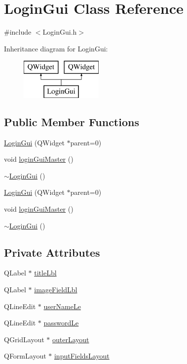 \hypertarget{class_login_gui}{\section{Login\-Gui Class Reference}
\label{class_login_gui}
}


{\ttfamily \#include $<$Login\-Gui.\-h$>$}

Inheritance diagram for Login\-Gui\-:\begin{figure}[H]
\begin{center}
\leavevmode
\includegraphics[height=2.000000cm]{class_login_gui}
\end{center}
\end{figure}
\subsection*{Public Member Functions}
\begin{DoxyCompactItemize}
\item 
\hyperlink{class_login_gui_af669845b99feac732dd79dcf0bf47da4}{Login\-Gui} (Q\-Widget $\ast$parent=0)
\item 
void \hyperlink{class_login_gui_ad9aa7b447216cda720e142d7b23d7ada}{login\-Gui\-Master} ()
\item 
\hyperlink{class_login_gui_a88c8fe5024711b4860052d80d5beddc1}{$\sim$\-Login\-Gui} ()
\item 
\hyperlink{class_login_gui_af669845b99feac732dd79dcf0bf47da4}{Login\-Gui} (Q\-Widget $\ast$parent=0)
\item 
void \hyperlink{class_login_gui_ad9aa7b447216cda720e142d7b23d7ada}{login\-Gui\-Master} ()
\item 
\hyperlink{class_login_gui_a88c8fe5024711b4860052d80d5beddc1}{$\sim$\-Login\-Gui} ()
\end{DoxyCompactItemize}
\subsection*{Private Attributes}
\begin{DoxyCompactItemize}
\item 
Q\-Label $\ast$ \hyperlink{class_login_gui_a565b6f7b6cd1dff7729219f237a4dfd3}{title\-Lbl}
\item 
Q\-Label $\ast$ \hyperlink{class_login_gui_a2db67d3caa82f2956af87f1c576a4464}{image\-Field\-Lbl}
\item 
Q\-Line\-Edit $\ast$ \hyperlink{class_login_gui_aeb8a7174d367f20dedcc6eb011ce0d6e}{user\-Name\-Le}
\item 
Q\-Line\-Edit $\ast$ \hyperlink{class_login_gui_a4efd7ef41a67cfdc6d88130d34c5b77f}{password\-Le}
\item 
Q\-Grid\-Layout $\ast$ \hyperlink{class_login_gui_abcebf364fa135ec3b00162e6fe6ef2d1}{outer\-Layout}
\item 
Q\-Form\-Layout $\ast$ \hyperlink{class_login_gui_a23e8876dd4dcef9dd12569f44a2c5b08}{input\-Fields\-Layout}
\end{DoxyCompactItemize}


